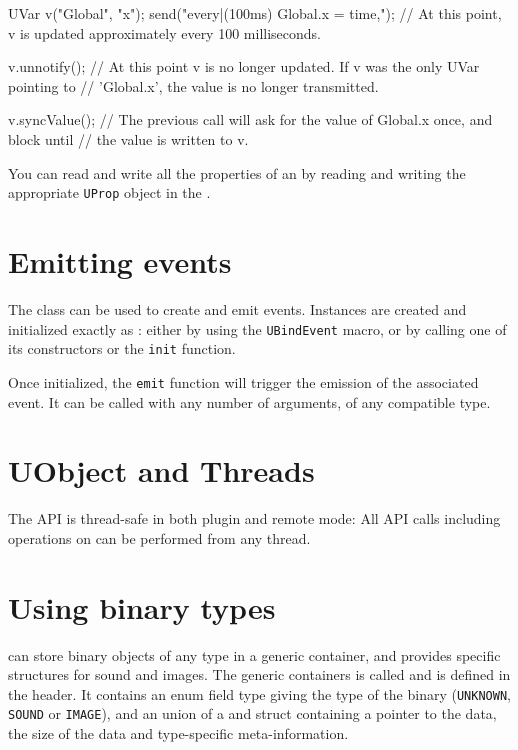 \begin{cxx}
UVar v("Global", "x");
send("every|(100ms) Global.x = time,");
// At this point, v is updated approximately every 100 milliseconds.

v.unnotify();
// At this point v is no longer updated. If v was the only UVar pointing to
// 'Global.x', the value is no longer transmitted.

v.syncValue();
// The previous call will ask for the value of Global.x once, and block until
// the value is written to v.
\end{cxx}

You can read and write all the \urbi properties of an \UVar by
reading and writing the appropriate \lstinline{UProp} object in the
\UVar.

\section{Emitting events}

The \UEvent class can be used to create and emit \us events. Instances are
created and initialized exactly as \UVar: either by using the
\lstinline{UBindEvent} macro, or by calling one of its constructors or the
\lstinline{init} function.

Once initialized, the \lstinline{emit} function will trigger the emission of
the associated \us event. It can be called with any number of arguments, of
any compatible type.

\section{UObject and Threads}

The \UObject API is thread-safe in both plugin and remote mode: All API
calls including operations on \UVar can be performed from any thread.

\section{Using binary types}

\urbi can store binary objects of any type in a generic container, and
provides specific structures for sound and images. The generic containers is
called \UBinary and is defined in the  header. It
contains an enum field type giving the type of the binary
(\lstinline{UNKNOWN}, \lstinline{SOUND} or \lstinline{IMAGE}), and an union
of a \USound and \UImage struct containing a pointer to the data, the size
of the data and type-specific meta-information.

